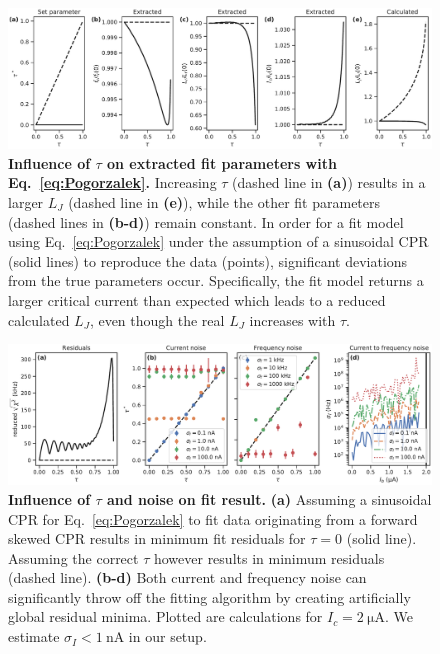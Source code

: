 \begin{figure}
	\centering
	\includegraphics[width=\linewidth]{chapter-gJJ-CPR/figs/SMFigure-tauparams}
	\caption{
		\textbf{Influence of $\tau$ on extracted fit parameters with Eq.~\ref{eq:Pogorzalek}.}
		Increasing $\tau$ (dashed line in \textbf{(a)}) results in a larger $L_J$ (dashed line in \textbf{(e)}), while the other fit parameters (dashed lines in \textbf{(b-d)}) remain constant.
		In order for a fit model using Eq.~\ref{eq:Pogorzalek} under the assumption of a sinusoidal CPR (solid lines) to reproduce the data (points), significant deviations from the true parameters occur.
		Specifically, the fit model returns a larger critical current than expected which leads to a reduced calculated $L_J$, even though the real $L_J$ increases with $\tau$.
	}
	\label{fig:SMtau}
\end{figure}

\begin{figure}
	\centering
	\includegraphics[width=\linewidth]{chapter-gJJ-CPR/figs/SMFigure-noise}
	\caption{
		\textbf{Influence of $\tau$ and noise on fit result.}
		\textbf{(a)} Assuming a sinusoidal CPR for Eq.~\ref{eq:Pogorzalek} to fit data originating from a forward skewed CPR results in minimum fit residuals for $\tau=0$ (solid line).
		Assuming the correct $\tau$ however results in minimum residuals (dashed line).
		\textbf{(b-d)} Both current and frequency noise can significantly throw off the fitting algorithm by creating artificially global residual minima.
		Plotted are calculations for $I_c=\SI{2}{\micro\ampere}$.
		We estimate $\sigma_I<\SI{1}{\nano\ampere}$ in our setup.
	}
	\label{fig:SMres}
\end{figure}

